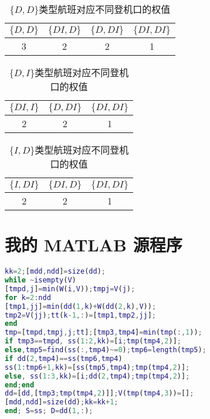\documentclass[bwprint]{gmcmthesis}
\begin{document}
\begin{table*}[!hbp]
    \centering
    \caption{$\{D, D\}$类型航班对应不同登机口的权值}
    \begin{tabular}{|c|c|c|c|}
        \hline  
        $\{D, D\}$ & $\{DI, D\}$ & $\{D, DI\}$ & $\{DI, DI\}$\\
        \hline 
        3&2&2&1\\
        \hline 
    \end{tabular}
\end{table*}




\begin{table*}[!hbp]
    \centering
    \caption{$\{D, I\}$类型航班对应不同登机口的权值}
    \begin{tabular}{|c|c|c|}
        \hline  
        $\{DI, I\}$ & $\{D, DI\}$ & $\{DI, DI\}$\\
        \hline 
        2&2&1\\
        \hline 
    \end{tabular}
\end{table*}

\begin{table*}[!hbp]
    \centering
    \caption{$\{I, D\}$类型航班对应不同登机口的权值}
    \begin{tabular}{|c|c|c|}
        \hline  
        $\{I, DI\}$ & $\{DI, D\}$ & $\{DI, DI\}$\\
        \hline 
        2&2&1\\
        \hline 
    \end{tabular}
\end{table*}







\newpage
\appendix
\section{我的 MATLAB 源程序}
\begin{lstlisting}[language=Matlab]%设置不同语言即可。
kk=2;[mdd,ndd]=size(dd);
while ~isempty(V)
[tmpd,j]=min(W(i,V));tmpj=V(j);
for k=2:ndd
[tmp1,jj]=min(dd(1,k)+W(dd(2,k),V));
tmp2=V(jj);tt(k-1,:)=[tmp1,tmp2,jj];
end
tmp=[tmpd,tmpj,j;tt];[tmp3,tmp4]=min(tmp(:,1));
if tmp3==tmpd, ss(1:2,kk)=[i;tmp(tmp4,2)];
else,tmp5=find(ss(:,tmp4)~=0);tmp6=length(tmp5);
if dd(2,tmp4)==ss(tmp6,tmp4)
ss(1:tmp6+1,kk)=[ss(tmp5,tmp4);tmp(tmp4,2)];
else, ss(1:3,kk)=[i;dd(2,tmp4);tmp(tmp4,2)];
end;end
dd=[dd,[tmp3;tmp(tmp4,2)]];V(tmp(tmp4,3))=[];
[mdd,ndd]=size(dd);kk=kk+1;
end; S=ss; D=dd(1,:);


 \end{lstlisting}
\end{document}

